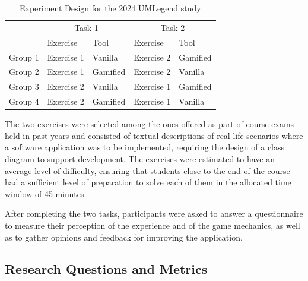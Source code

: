 \begin{table}[t]
\centering
\caption{Experiment Design for the 2024 UMLegend study}
\label{tab:exp_design_4}
\footnotesize
\begin{tabular}{@{}p{} p{} p{} p{} p{}@{}}
\toprule
& \multicolumn{2}{c}{Task 1} & \multicolumn{2}{c}{Task 2} \\
& Exercise & Tool & Exercise & Tool \\
\midrule
Group 1 & Exercise 1 & Vanilla & Exercise 2 & Gamified \\
Group 2 & Exercise 1 & Gamified & Exercise 2 & Vanilla \\
Group 3 & Exercise 2 & Vanilla & Exercise 1 & Gamified \\
Group 4 & Exercise 2 & Gamified & Exercise 1 & Vanilla \\
\bottomrule
\end{tabular}%
\end{table}

The two exercises were selected among the ones offered as part of course exams held in past years and consisted of textual descriptions of real-life scenarios where a software application was to be implemented, requiring the design of a class diagram to support development. The exercises were estimated to have an average level of difficulty, ensuring that students close to the end of the course had a sufficient level of preparation to solve each of them in the allocated time window of 45 minutes.

After completing the two tasks, participants were asked to answer a questionnaire to measure their perception of the experience and of the game mechanics, as well as to gather opinions and feedback for improving the application.


\subsection{Research Questions and Metrics}

